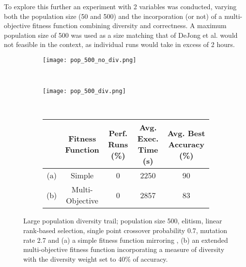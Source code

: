 To explore this further an experiment with 2 variables was conducted, varying
both the population size (50 and 500) and the incorporation (or not) of a
multi-objective fitness function combining diversity and correctness. A maximum
population size of 500 was used as a
size matching that of DeJong et al. would not feasible in the context, as individual
runs would take in excess of 2 hours.

\begin{figure}
	\centering
	\begin{subfigure}[ht]{0.49\textwidth}
		\texttt{[image: pop\_500\_no\_div.png]}
		\caption{}
		\label{fig:500_no_div}
		\vspace{1em}
	\end{subfigure}
	~
	\begin{subfigure}[ht]{0.49\textwidth}
		\texttt{[image: pop\_500\_div.png]}
		\caption{}
		\label{fig:500_div}
		\vspace{1em}
	\end{subfigure}
	~
	\begin{subfigure}[ht]{\textwidth}
		\centering
		\begin{tabular}{ccccc}
			\toprule
			& \bfseries{Fitness Function} &
			\bfseries{Perf. Runs (\%)} &
			\bfseries{Avg. Exec. Time (s)} & \bfseries{Avg. Best Accuracy (\%)}\\
			\midrule
			(a) & Simple & 0 & 2250 & 90\\
			(b) & Multi-Objective & 0 & 2857 & 83\\
			\bottomrule
		\end{tabular}
	\end{subfigure}

	\caption[Large population diversity trail]{Large population diversity trail;
		population size 500, elitism, linear rank-based selection, single point
		crossover probability 0.7, mutation rate 2.7 and
		(a) a simple fitness function mirroring \cite{10.1007/3-540-63173-9_61},
		(b) an extended multi-objective fitness function incorporating a measure
		of diversity with the diversity weight set to 40\% of accuracy.}
	\label{fig:500}
\end{figure}

